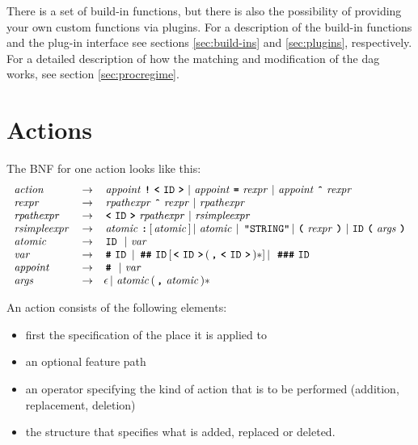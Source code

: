 \documentclass[11pt,a4paper]{report}
\begin{document}
There is a set of build-in functions, but there is also the possibility of
providing your own custom functions via plugins. For a description of the
build-in functions and the plug-in interface see sections \ref{sec:build-ins}
and \ref{sec:plugins}, respectively. For a detailed description of how the
matching and modification of the dag works, see section \ref{sec:procregime}.

\section{Actions}

The BNF for one action looks like this:
\[
\begin{array}{lcl}
\nt{action} & \rightarrow & \nt{appoint} \tok{!} \tok{<}\id \tok{>} \BAR
\nt{appoint} \tok{=} \nt{rexpr} \BAR  \nt{appoint} \tok{\^{}} \nt{rexpr}\\
\nt{rexpr} & \rightarrow &
  \nt{rpathexpr} \tok{\^{}} \nt{rexpr} \BAR
  \nt{rpathexpr}\\
\nt{rpathexpr} & \rightarrow &
  \tok{<}\id \tok{>} \nt{rpathexpr} \BAR
  \nt{rsimpleexpr}\\
\nt{rsimpleexpr} & \rightarrow &
  \nt{atomic} \tok{:} [ \nt{atomic} ] \BAR
  \nt{atomic} \BAR \ \verb$"STRING"$  \BAR
  \tok{(} \nt{rexpr} \tok{)} \BAR
  \id\tok{(}\nt{args}\tok{)}\\
\nt{atomic} & \rightarrow & \id \ \BAR \nt{var}\\
\nt{var} & \rightarrow &
  \tok{\#}\id \ \mbox{\textbar}
  \ \tok{\#\#}\id [ \tok{<}\id \tok{>} ( \tok{,} \tok{<}\id \tok{>} )* ] \BAR
  \ \tok{\#\#\#}\id \\
\nt{appoint} & \rightarrow & \tok{\#}  \ \BAR \nt{var}\\
\nt{args} & \rightarrow & \epsilon
  \BAR \nt{atomic} (\tok{,} \nt{atomic})*
\end{array}
\]

An action consists of the following elements:
\begin{itemize}
\item first the specification of the place it is applied to
\item an optional feature path
\item an operator specifying the kind of action that is
  to be performed (addition, replacement, deletion)
\item the structure that specifies what is added, replaced or deleted.
\end{itemize}
\end{document}
